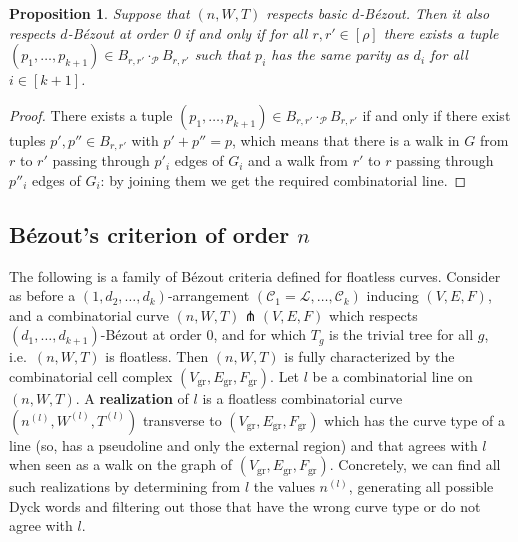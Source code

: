 \documentclass[11pt,reqno]{amsart}
\theoremstyle{plain}
\newtheorem{proposition}[subsection]{Proposition}
\theoremstyle{definition}
\theoremstyle{remark}
\numberwithin{equation}{subsection}
\newcommand*{\calC}{\mathcal{C}}
\newcommand*{\calL}{\mathcal{L}}
\newcommand*{\calP}{\mathcal{P}}
\DeclareMathOperator{\gr}{gr}
\begin{document}
\begin{proposition}
    Suppose that $(n,W,T)$ respects basic $d$-Bézout. Then it also respects $d$-Bézout at order 0 if and only if for all $r,r'\in[\rho]$ there exists a tuple $(p_1,\dots,p_{k+1})\in B_{r,r'}\cdot_{\calP}B_{r,r'}$ such that $p_i$ has the same parity as $d_i$ for all $i\in[k+1]$.
\end{proposition}

\begin{proof}
    There exists a tuple $(p_1,\dots,p_{k+1})\in B_{r,r'}\cdot_{\calP}B_{r,r'}$ if and only if there exist tuples $p',p''\in B_{r,r'}$ with $p'+p''=p$, which means that there is a walk in $G$ from $r$ to $r'$ passing through $p'_i$ edges of $G_i$ and a walk from $r'$ to $r$ passing through $p''_i$ edges of $G_i$: by joining them we get the required combinatorial line.
\end{proof}


\subsection{Bézout's criterion of order \texorpdfstring{$n$}{n}}\label{subsec:bezoutn}

The following is a family of Bézout criteria defined for floatless curves. Consider as before a $(1,d_2,\dots,d_k)$-arrangement $(\calC_1=\calL,\dots,\calC_k)$ inducing $(V,E,F)$, and a combinatorial curve $(n,W,T)\pitchfork(V,E,F)$ which respects $(d_1,\dots,d_{k+1})$-Bézout at order 0, and for which $T_g$ is the trivial tree for all $g$, i.e.\ $(n,W,T)$ is floatless. Then $(n,W,T)$ is fully characterized by the combinatorial cell complex $(V_{\gr},E_{\gr},F_{\gr})$. Let $l$ be a combinatorial line on $(n,W,T)$. A \textbf{realization} of $l$ is a floatless combinatorial curve $(n^{(l)},W^{(l)},T^{(l)})$ transverse to $(V_{\gr},E_{\gr},F_{\gr})$ which has the curve type of a line (so, has a pseudoline and only the external region) and that agrees with $l$ when seen as a walk on the graph of $(V_{\gr},E_{\gr},F_{\gr})$. Concretely, we can find all such realizations by determining from $l$ the values $n^{(l)}$, generating all possible Dyck words and filtering out those that have the wrong curve type or do not agree with $l$.
\end{document}
